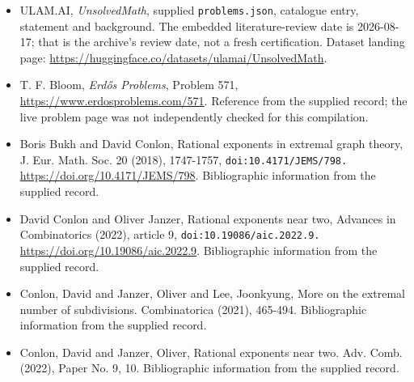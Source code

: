 \documentclass[11pt,a4paper]{article}
\begin{document}
{\small

\begin{itemize}

\item[\hypertarget{source:statement:1}{S1}] ULAM.AI, \emph{UnsolvedMath}, supplied \texttt{problems.json}, catalogue entry, statement and background. The embedded literature-review date is 2026-08-17; that is the archive’s review date, not a fresh certification. Dataset landing page: \url{https://huggingface.co/datasets/ulamai/UnsolvedMath}.

\item[\hypertarget{source:statement:2}{S2}] T. F. Bloom, \emph{Erdős Problems}, Problem 571, \url{https://www.erdosproblems.com/571}. Reference from the supplied record; the live problem page was not independently checked for this compilation.

\item[\hypertarget{source:statement:3}{S3}] Boris Bukh and David Conlon, Rational exponents in extremal graph theory, J. Eur. Math. Soc. 20 (2018), 1747-1757, \nolinkurl{doi:10.4171/JEMS/798.} \url{https://doi.org/10.4171/JEMS/798}. Bibliographic information from the supplied record.

\item[\hypertarget{source:statement:4}{S4}] David Conlon and Oliver Janzer, Rational exponents near two, Advances in Combinatorics (2022), article 9, \nolinkurl{doi:10.19086/aic.2022.9.} \url{https://doi.org/10.19086/aic.2022.9}. Bibliographic information from the supplied record.

\item[\hypertarget{source:statement:5}{S5}] Conlon, David and Janzer, Oliver and Lee, Joonkyung, More on the extremal number of subdivisions. Combinatorica (2021), 465-494. Bibliographic information from the supplied record.

\item[\hypertarget{source:statement:6}{S6}] Conlon, David and Janzer, Oliver, Rational exponents near two. Adv. Comb. (2022), Paper No. 9, 10. Bibliographic information from the supplied record.

\end{itemize}

}

\label{end:statement}
\end{document}
